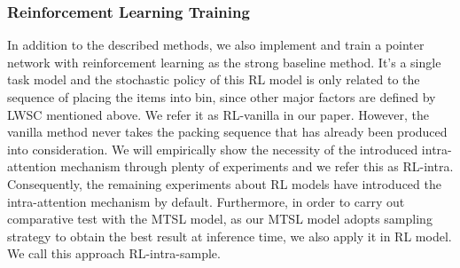 \subsubsection{Reinforcement Learning Training}
In addition to the described methods, we also implement and train a pointer network with reinforcement learning as the strong baseline method. It's a single task model and
the stochastic policy of this RL model is only related to the sequence of placing the items into bin, since other major factors are defined by LWSC mentioned above.
We refer it as RL-vanilla in our paper. However, the vanilla method never takes the packing sequence that has already been produced into consideration.
We will empirically show the necessity of the introduced intra-attention mechanism through plenty of experiments and we refer this as RL-intra.
Consequently, the remaining experiments about RL models have introduced the intra-attention mechanism by default.
Furthermore, in order to carry out comparative test with the MTSL model, as our MTSL model adopts sampling strategy to obtain the best result at inference time, we also apply it in RL model. We call this approach RL-intra-sample. %

